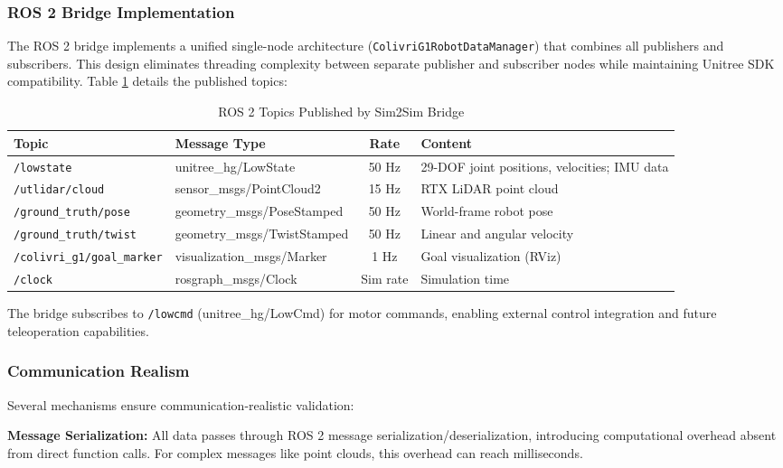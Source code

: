 \documentclass[12pt,a4paper]{article}
\begin{document}
\subsubsection{ROS 2 Bridge Implementation}

The ROS 2 bridge implements a unified single-node architecture (\texttt{ColivriG1RobotDataManager}) that combines all publishers and subscribers. This design eliminates threading complexity between separate publisher and subscriber nodes while maintaining Unitree SDK compatibility. Table \ref{tab:ros2_topics} details the published topics:

\begin{table}[H]
\centering
\caption{ROS 2 Topics Published by Sim2Sim Bridge}
\label{tab:ros2_topics}
\footnotesize
\begin{tabular}{l|l|c|p{4.5cm}}
\hline
\textbf{Topic} & \textbf{Message Type} & \textbf{Rate} & \textbf{Content} \\
\hline
\hline
\texttt{/lowstate} & unitree\_hg/LowState & 50 Hz & 29-DOF joint positions, velocities; IMU data \\
\hline
\texttt{/utlidar/cloud} & sensor\_msgs/PointCloud2 & 15 Hz & RTX LiDAR point cloud \\
\hline
\texttt{/ground\_truth/pose} & geometry\_msgs/PoseStamped & 50 Hz & World-frame robot pose \\
\hline
\texttt{/ground\_truth/twist} & geometry\_msgs/TwistStamped & 50 Hz & Linear and angular velocity \\
\hline
\texttt{/colivri\_g1/goal\_marker} & visualization\_msgs/Marker & 1 Hz & Goal visualization (RViz) \\
\hline
\texttt{/clock} & rosgraph\_msgs/Clock & Sim rate & Simulation time \\
\hline
\end{tabular}
\end{table}

The bridge subscribes to \texttt{/lowcmd} (unitree\_hg/LowCmd) for motor commands, enabling external control integration and future teleoperation capabilities.

\subsubsection{Communication Realism}

Several mechanisms ensure communication-realistic validation:

\textbf{Message Serialization:} All data passes through ROS 2 message serialization/deserialization, introducing computational overhead absent from direct function calls. For complex messages like point clouds, this overhead can reach milliseconds.
\end{document}
